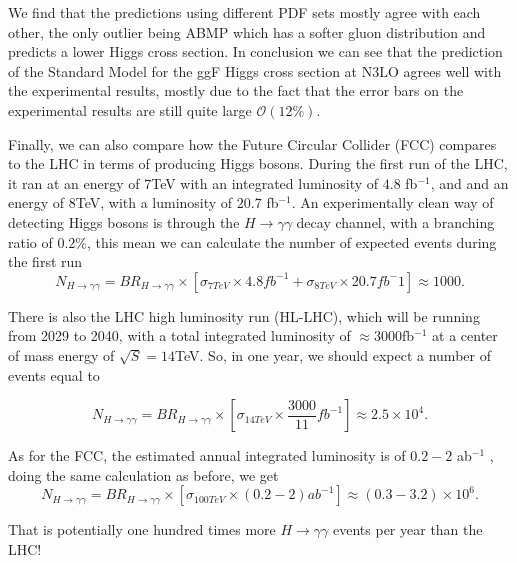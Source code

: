 \documentclass[EPJ,twocolumn]{webofc}
\begin{document}
We find that the predictions using different PDF sets mostly agree with each other, the only outlier being ABMP which has a softer gluon distribution and predicts a lower Higgs cross section. In conclusion we can see that the prediction of the Standard Model for the ggF Higgs cross section at N3LO agrees well with the experimental results, mostly due to the fact that the error bars on the experimental results are still quite large $\mathcal{O}(12\%)$.

Finally, we can also compare how the Future Circular Collider (FCC) compares to the LHC in terms of producing Higgs bosons. During the first run of the LHC, it ran at an energy of $7$TeV with an integrated luminosity of $4.8$ fb$^{-1}$, and and an energy of $8$TeV, with a luminosity of $20.7$ fb$^{-1}$. An experimentally clean way of detecting Higgs bosons is through the $H\rightarrow\gamma\gamma$ decay channel, with a branching ratio of $0.2\%$, this mean we can calculate the number of expected events during the first run
\small
\begin{equation*}
         N_{H\rightarrow\gamma\gamma} = BR_{H\rightarrow\gamma\gamma} \times\left[\sigma_{7TeV} \times 4.8fb^{-1} + \sigma_{8TeV} \times 20.7fb^-1\right] \approx 1000.   
\end{equation*}

There is also the LHC high luminosity run (HL-LHC)\cite{Styles:2015svq}, which will be running from 2029 to 2040, with a total integrated luminosity of $\approx 3000$fb$^{-1}$ at a center of mass energy of $\sqrt{S} = 14$TeV. So, in one year, we should expect a number of events equal to

\small
\begin{equation*}
         N_{H\rightarrow\gamma\gamma} = BR_{H\rightarrow\gamma\gamma} \times\left[\sigma_{14TeV} \times \frac{3000}{11}fb^{-1}\right] \approx 2.5\times 10^4.
\end{equation*}

\normalsize
As for the FCC, the estimated annual integrated luminosity  is of $0.2-2$ ab$^{-1}$ \cite{Zimmermann:IPAC2016-TUPMW037}, doing the same calculation as before, we get
\small
\begin{equation*}
         N_{H\rightarrow\gamma\gamma} = BR_{H\rightarrow\gamma\gamma} \times\left[\sigma_{100TeV} \times (0.2-2)ab^{-1}\right] \approx (0.3-3.2) \times 10^6.
\end{equation*}
     
\normalsize
That is potentially one hundred times more $H\rightarrow\gamma\gamma$ events per year than the LHC! 
\end{document}
